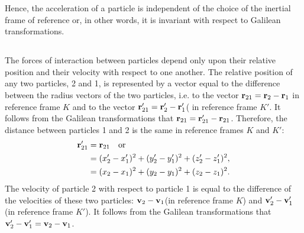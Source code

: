 \begin{figure}[!ht]
\centering

\end{figure}
Hence, the acceleration of a particle is independent of the choice of the inertial frame of reference or, in other words, it is inva­riant with respect to Galilean transformations.

\subsection{}\label{2.8.3} The forces of interaction between particles depend only upon their relative position and their velocity with respect to one another. The relative position of any two particles, 2 and 1, is represented by a vector equal to the difference between the radius vectors of the two particles, i.e. to the vector $\vb{r}_{21} = \vb{r}_{2} - \vb{r}_{1}$ in reference frame $K$ and to the vector $\vb{r}_{21}' = \vb{r}_{2}' - \vb{r}_{1}'$( in reference frame $K'$. It follows from the Galilean transformations that $\vb{r}_{21} = \vb{r}_{21}' - \vb{r}_{21}$. Therefore, the distance between particles 1 and 2 is the same in reference frames $K$ and $K'$:
\begin{align*}%
\vb{r}_{21}' & = \vb{r}_{21} \qor  \\
& = (x_{2}' - x_{1}')^{2}  + (y_{2}' - y_{1}')^{2} + (z_{2}' - z_{1}')^{2},\\
& = (x_{2} - x_{1})^{2}  + (y_{2} - y_{1})^{2} + (z_{2} - z_{1})^{2}.
\end{align*}
The velocity of particle 2 with respect to particle 1 is equal to the difference of the velocities of these two particles: $\vb{v}_{2}- \vb{v}_{1}$(in reference frame $K$) and $\vb{v}_{2}'- \vb{v}_{1}'$ (in reference frame $K'$). It follows from the Galilean transformations that $\vb{v}_{2}'- \vb{v}_{1}' = \vb{v}_{2}- \vb{v}_{1}$. 


